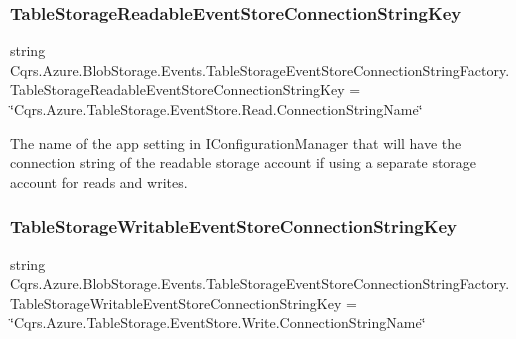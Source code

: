 \subsubsection{\texorpdfstring{Table\+Storage\+Readable\+Event\+Store\+Connection\+String\+Key}{TableStorageReadableEventStoreConnectionStringKey}}
{\footnotesize\ttfamily string Cqrs.\+Azure.\+Blob\+Storage.\+Events.\+Table\+Storage\+Event\+Store\+Connection\+String\+Factory.\+Table\+Storage\+Readable\+Event\+Store\+Connection\+String\+Key = \char`\"{}Cqrs.\+Azure.\+Table\+Storage.\+Event\+Store.\+Read.\+Connection\+String\+Name\char`\"{}\hspace{0.3cm}{\ttfamily [static]}}



The name of the app setting in I\+Configuration\+Manager that will have the connection string of the readable storage account if using a separate storage account for reads and writes. 

\mbox{\label{classCqrs_1_1Azure_1_1BlobStorage_1_1Events_1_1TableStorageEventStoreConnectionStringFactory_a73df7618d5978a2c0d2e69880b799369_a73df7618d5978a2c0d2e69880b799369}} 
\subsubsection{\texorpdfstring{Table\+Storage\+Writable\+Event\+Store\+Connection\+String\+Key}{TableStorageWritableEventStoreConnectionStringKey}}
{\footnotesize\ttfamily string Cqrs.\+Azure.\+Blob\+Storage.\+Events.\+Table\+Storage\+Event\+Store\+Connection\+String\+Factory.\+Table\+Storage\+Writable\+Event\+Store\+Connection\+String\+Key = \char`\"{}Cqrs.\+Azure.\+Table\+Storage.\+Event\+Store.\+Write.\+Connection\+String\+Name\char`\"{}\hspace{0.3cm}{\ttfamily [static]}}



